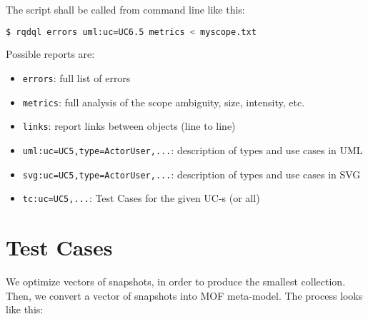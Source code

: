 \documentclass{article}
\begin{document}
    The script shall be called from command line like this:
    
    \begin{lstlisting}[language=bash]
$ rqdql errors uml:uc=UC6.5 metrics < myscope.txt
    \end{lstlisting}
    
    Possible reports are:
    
    \begin{itemize}
        \item \texttt{errors}: full list of errors
        \item \texttt{metrics}: full analysis of the scope ambiguity, size, intensity, etc.
        \item \texttt{links}: report links between objects (line to line)
        \item \texttt{uml:uc=UC5,type=ActorUser,...}: description of types and use cases in UML
        \item \texttt{svg:uc=UC5,type=ActorUser,...}: description of types and use cases in SVG
        \item \texttt{tc:uc=UC5,...}: Test Cases for the given UC-s (or all)
    \end{itemize}
    
\section{Test Cases}\label{sec:test-cases}

    We optimize vectors of snapshots, in order
    to produce the smallest collection. 
    Then, we convert a vector of snapshots into MOF meta-model.
    The process looks like this:
    
    
\end{document}
